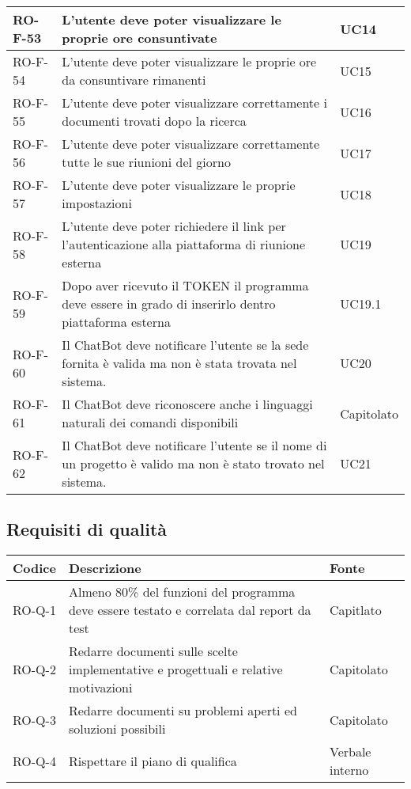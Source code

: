 \begin{center}
\begin{tabular}{ | m{8em} | m{18em} | m{12em} | }
\hline
RO-F-53&L’utente deve poter visualizzare le proprie ore consuntivate &UC14 \\
\hline
RO-F-54&L’utente deve poter visualizzare le proprie ore da consuntivare rimanenti &UC15 \\
\hline
RO-F-55&L’utente deve poter visualizzare correttamente i documenti trovati dopo la ricerca &UC16 \\
\hline
RO-F-56&L’utente deve poter visualizzare correttamente tutte le sue riunioni del giorno & UC17\\
\hline
RO-F-57&L’utente deve poter visualizzare le proprie impostazioni &UC18 \\
\hline
RO-F-58&L’utente deve poter richiedere il link per l’autenticazione alla piattaforma di riunione esterna &UC19\\
\hline
RO-F-59&Dopo aver ricevuto il TOKEN il programma deve essere in grado di inserirlo dentro piattaforma esterna &UC19.1 \\
\hline
RO-F-60&Il ChatBot deve notificare l'utente se la sede fornita è valida ma non è stata trovata nel sistema.&UC20 \\
\hline
RO-F-61&Il ChatBot deve riconoscere anche i linguaggi naturali dei comandi disponibili &Capitolato \\
\hline
RO-F-62&Il ChatBot deve notificare l'utente se il nome di un progetto è valido ma non è stato trovato nel sistema. &UC21 \\
\hline
\end{tabular}
\end{center}
\newpage

\subsection{Requisiti di qualità}
\begin{center}
\renewcommand{\arraystretch}{1.8} %
\begin{tabular}{ | m{8em} | m{18em} | m{12em} | }
\hline
Codice&Descrizione&Fonte\\
\hline
RO-Q-1&Almeno 80\% del funzioni del programma deve essere testato e correlata dal report da test&Capitlato\\
\hline
RO-Q-2&Redarre documenti sulle scelte implementative e progettuali e relative motivazioni&Capitolato\\
\hline
RO-Q-3&Redarre documenti su problemi aperti ed soluzioni possibili&Capitolato\\
\hline
RO-Q-4&Rispettare il piano di qualifica&Verbale interno\\
\hline
\end{tabular}
\end{center}

